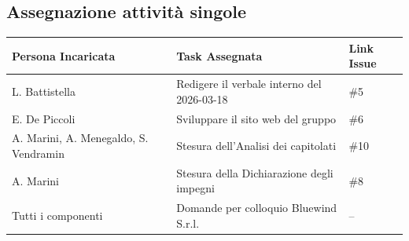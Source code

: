\documentclass[a4paper, 10pt, colorlinks=true, linkcolor=black, urlcolor=blue, citecolor=blue, hidelinks]{article}
\begin{document}
\subsection{Assegnazione attività singole}
\begin{center}
\renewcommand{\arraystretch}{1.4}
\begin{tabular}{|p{4.2cm}|p{6.2cm}|p{2.2cm}|}
\hline
\textbf{Persona Incaricata} & \textbf{Task Assegnata} & \centering\textbf{Link Issue} \tabularnewline
\hline
L. Battistella & Redigere il verbale interno del 2026-03-18 & \centering \#5 \tabularnewline
\hline
E. De Piccoli & Sviluppare il sito web del gruppo & \centering  \#6 \tabularnewline
\hline
A. Marini, A. Menegaldo, S. Vendramin & Stesura dell'Analisi dei capitolati & \centering \#10 \tabularnewline
\hline
A. Marini & Stesura della Dichiarazione degli impegni & \centering \#8 \tabularnewline
\hline
Tutti i componenti & Domande per colloquio Bluewind S.r.l. & \centering -- \tabularnewline
\hline
\end{tabular}
\end{center}
\end{document}
